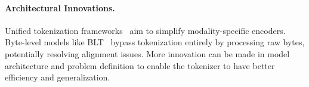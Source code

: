\paragraph{Architectural Innovations.}
Unified tokenization frameworks~\cite{yang2023teal} aim to simplify modality-specific encoders. Byte-level models like BLT~\cite{pagnoni2024blt} bypass tokenization entirely by processing raw bytes, potentially resolving alignment issues.
More innovation can be made in model architecture and problem definition to enable the tokenizer to have better efficiency and generalization.


